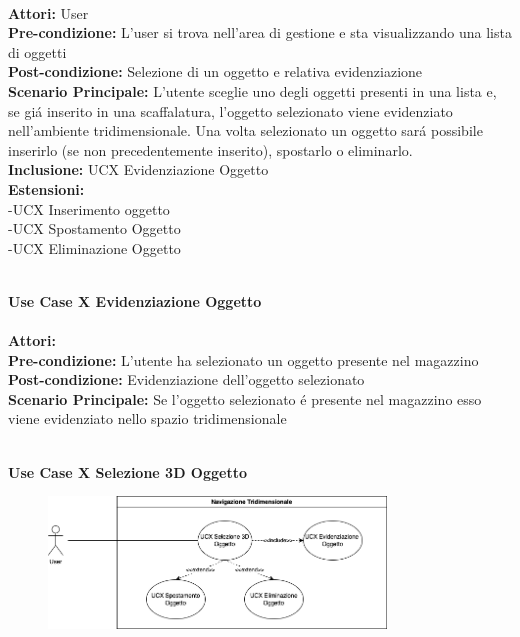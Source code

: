\vspace{0.5cm}

\large\textbf{} \\
\textbf{Attori:} User\\
\textbf{Pre-condizione:} L'user si trova nell'area di gestione e sta visualizzando una lista di oggetti \\
\textbf{Post-condizione: } Selezione di un oggetto e relativa evidenziazione\\
\textbf{Scenario Principale:}  L'utente sceglie uno degli oggetti presenti in una lista e, se giá inserito in una scaffalatura, l'oggetto selezionato viene evidenziato nell'ambiente tridimensionale. Una volta selezionato un oggetto sará possibile inserirlo (se non precedentemente inserito), spostarlo o eliminarlo.\\
\textbf{Inclusione:} UCX Evidenziazione Oggetto \\
\textbf{Estensioni:} \\ 
-UCX Inserimento oggetto \\ -UCX Spostamento Oggetto \\ -UCX Eliminazione Oggetto

\vspace{0.5cm}

\Large\textbf{}\\
\Large\textbf{Use Case X Evidenziazione Oggetto} \\

\large\textbf{} \\
\textbf{Attori:}\\
\textbf{Pre-condizione:} L'utente ha selezionato un oggetto presente nel magazzino \\
\textbf{Post-condizione: } Evidenziazione dell'oggetto selezionato \\
\textbf{Scenario Principale:}  Se l'oggetto selezionato é presente nel magazzino esso viene evidenziato nello spazio tridimensionale\\

\vspace{0.5cm}
\newpage

\Large\textbf{}\\
\Large\textbf{Use Case X Selezione 3D Oggetto} \\
\begin{figure}[h]
  \centering
  \includegraphics[width=0.8\textwidth]{UseCasesImages/3DSel.png}
\end{figure}


